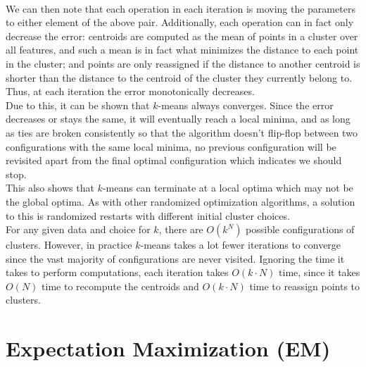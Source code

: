 \documentclass[12pt]{article}
\newcommand{\x}{\cdot}
\begin{document}
\\\newline
We can then note that each operation in each iteration is moving the parameters to either element of the above pair. Additionally, each operation can in fact only decrease the error: centroids are computed as the mean of points in a cluster over all features, and such a mean is in fact what minimizes the distance to each point in the cluster; and points are only reassigned if the distance to another centroid is shorter than the distance to the centroid of the cluster they currently belong to. Thus, at each iteration the error monotonically decreases.
\\\newline
Due to this, it can be shown that $k$-means always converges. Since the error decreases or stays the same, it will eventually reach a local minima, and as long as ties are broken consistently so that the algorithm doesn't flip-flop between two configurations with the same local minima, no previous configuration will be revisited apart from the final optimal configuration which indicates we should stop.
\\\newline
This also shows that $k$-means can terminate at a local optima which may not be the global optima. As with other randomized optimization algorithms, a solution to this is randomized restarts with different initial cluster choices.
\\\newline
For any given data and choice for $k$, there are $O(k^N)$ possible configurations of clusters. However, in practice $k$-means takes a lot fewer iterations to converge since the vast majority of configurations are never visited. Ignoring the time it takes to perform computations, each iteration takes $O(k \x N)$ time, since it takes $O(N)$ time to recompute the centroids and $O(k \x N)$ time to reassign points to clusters.

\section{Expectation Maximization (EM)}
\end{document}
